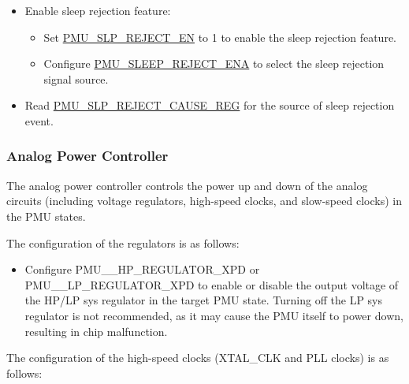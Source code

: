 \documentclass[main\_\_EN.tex]{subfiles}
\begin{document}
\begin{itemize}
    \item Enable sleep rejection feature:
    \begin{itemize}
        \item Set \hyperref[fielddesc:PMUSLPREJECTEN]{PMU\_SLP\_REJECT\_EN} to 1 to enable the sleep rejection feature.
        \item Configure \hyperref[fielddesc:PMUSLEEPREJECTENA]{PMU\_SLEEP\_REJECT\_ENA} to select the sleep rejection signal source.
    \end{itemize}
    \item Read \hyperref[fielddesc:PMUREJECTCAUSE]{PMU\_SLP\_REJECT\_CAUSE\_REG} for the source of sleep rejection event.
\end{itemize}

\subsubsection{Analog Power Controller}\label{sec:lowpowm_analog_power_controller}

The analog power controller controls the power up and down of the analog circuits (including voltage regulators, high-speed clocks, and slow-speed clocks) in the PMU states.

The configuration of the regulators is as follows:

\begin{itemize}
    \item Configure PMU\_\_HP\_REGULATOR\_XPD or PMU\_\_LP\_REGULATOR\_XPD to enable or disable the output voltage of the HP/LP sys regulator in the target PMU state. Turning off the LP sys regulator is not recommended, as it may cause the PMU itself to power down, resulting in chip malfunction.
\end{itemize}

The configuration of the high-speed clocks (XTAL\_CLK and PLL clocks) is as follows:
\end{document}
